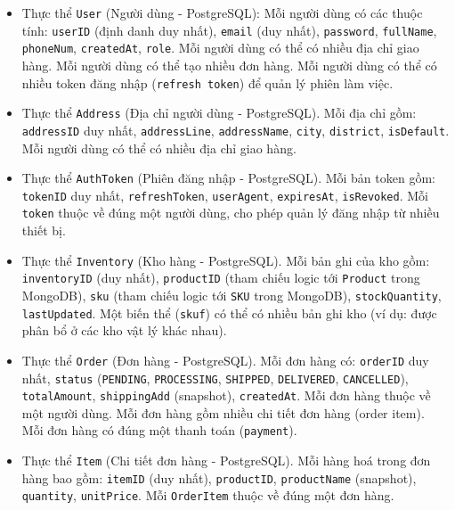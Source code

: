 \begin{itemize}[label=$\circ$]
    \item Thực thể \texttt{User} (Người dùng - PostgreSQL): Mỗi người dùng có các thuộc tính: \texttt{userID} (định danh duy nhất), \texttt{email} (duy nhất), \texttt{password}, \texttt{fullName}, \texttt{phoneNum}, \texttt{createdAt}, \texttt{role}. Mỗi người dùng có thể có nhiều địa chỉ giao hàng. Mỗi người dùng có thể tạo nhiều đơn hàng. Mỗi người dùng có thể có nhiều token đăng nhập (\texttt{refresh token}) để quản lý phiên làm việc.
    
    \item Thực thể \texttt{Address} (Địa chỉ người dùng - PostgreSQL). Mỗi địa chỉ gồm: \texttt{addressID} duy nhất, \texttt{addressLine}, \texttt{addressName}, \texttt{city}, \texttt{district}, \texttt{isDefault}. Mỗi người dùng có thể có nhiều địa chỉ giao hàng.
    
    \item Thực thể \texttt{AuthToken} (Phiên đăng nhập - PostgreSQL). Mỗi bản token gồm: \texttt{tokenID} duy nhất, \texttt{refreshToken}, \texttt{userAgent}, \texttt{expiresAt}, \texttt{isRevoked}. Mỗi \texttt{token} thuộc về đúng một người dùng, cho phép quản lý đăng nhập từ nhiều thiết bị. 

    \item Thực thể \texttt{Inventory} (Kho hàng - PostgreSQL). Mỗi bản ghi của kho gồm: \texttt{inventoryID} (duy nhất), \texttt{productID} (tham chiếu logic tới \texttt{Product} trong MongoDB), \texttt{sku} (tham chiếu logic tới \texttt{SKU} trong MongoDB), \texttt{stockQuantity}, \texttt{lastUpdated}. Một biến thể (\texttt{skuf}) có thể có nhiều bản ghi kho (ví dụ: được phân bổ ở các kho vật lý khác nhau).

    \item Thực thể \texttt{Order} (Đơn hàng - PostgreSQL). Mỗi đơn hàng có: \texttt{orderID} duy nhất, \texttt{status} (\texttt{PENDING}, \texttt{PROCESSING}, \texttt{SHIPPED}, \texttt{DELIVERED}, \texttt{CANCELLED}), \texttt{totalAmount}, \texttt{shippingAdd} (snapshot), \texttt{createdAt}. Mỗi đơn hàng thuộc về một người dùng. Mỗi đơn hàng gồm nhiều chi tiết đơn hàng (order item). Mỗi đơn hàng có đúng một thanh toán (\texttt{payment}).
    
    \item Thực thể \texttt{Item} (Chi tiết đơn hàng - PostgreSQL). Mỗi hàng hoá trong đơn hàng bao gồm: \texttt{itemID} (duy nhất), \texttt{productID}, \texttt{productName} (snapshot), \texttt{quantity}, \texttt{unitPrice}. Mỗi \texttt{OrderItem} thuộc về đúng một đơn hàng.


\end{itemize}
